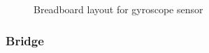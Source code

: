         \begin{figure}
          \centering
          \caption{Breadboard layout for gyroscope sensor}\label{figure:gyroscope-sensor}
        \end{figure}

      \subsubsection{Bridge}
